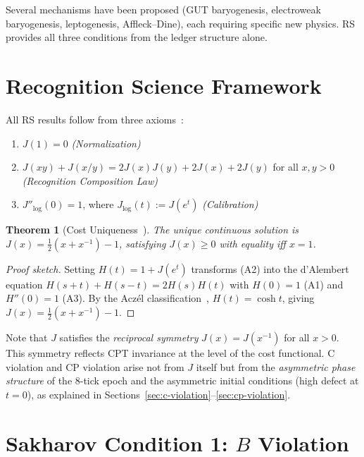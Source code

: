 \documentclass[12pt,a4paper]{article}
\newtheorem{theorem}{Theorem}[section]
\theoremstyle{definition}
\theoremstyle{remark}
\begin{document}
Several mechanisms have been proposed (GUT baryogenesis,
electroweak baryogenesis, leptogenesis, Affleck--Dine), each
requiring specific new physics.  RS~\cite{RS_Axioms} provides all three conditions
from the ledger structure alone.

\section{Recognition Science Framework}
\label{sec:framework}

All RS results follow from three axioms~\cite{RS_Axioms}:
\begin{enumerate}[label=(A\arabic*),nosep]
  \item $J(1) = 0$ \hfill\textit{(Normalization)}
  \item $J(xy) + J(x/y) = 2J(x)J(y) + 2J(x) + 2J(y)$ for all $x, y > 0$
  \hfill\textit{(Recognition Composition Law)}
  \item $J''_{\log}(0) = 1$, where $J_{\log}(t) := J(e^t)$
  \hfill\textit{(Calibration)}
\end{enumerate}

\begin{theorem}[Cost Uniqueness~\cite{RS_Axioms}]
\label{thm:J}
The unique continuous solution is $J(x) = \tfrac{1}{2}(x + x^{-1}) - 1$,
satisfying $J(x) \geq 0$ with equality iff $x = 1$.
\end{theorem}

\begin{proof}[Proof sketch]
Setting $H(t) = 1 + J(e^t)$ transforms (A2) into the d'Alembert equation
$H(s+t)+H(s-t) = 2H(s)H(t)$ with $H(0)=1$ (A1) and $H''(0)=1$ (A3).
By the Acz\'el classification~\cite{Aczel1966}, $H(t) = \cosh t$, giving
$J(x) = \tfrac{1}{2}(x+x^{-1})-1$.
\end{proof}

Note that $J$ satisfies the \emph{reciprocal symmetry}
$J(x) = J(x^{-1})$ for all $x > 0$.  This symmetry reflects
CPT invariance at the level of the cost functional.  C violation
and CP violation arise not from $J$ itself but from the
\emph{asymmetric phase structure} of the 8-tick epoch and the
asymmetric initial conditions (high defect at $t = 0$), as
explained in Sections~\ref{sec:c-violation}--\ref{sec:cp-violation}.

\section{Sakharov Condition 1: $B$ Violation}
\label{sec:b-violation}
\end{document}
